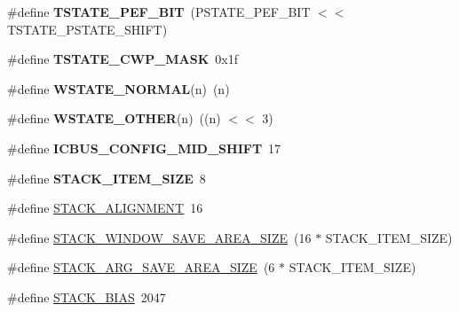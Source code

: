 \begin{DoxyCompactItemize}
\item 
\mbox{\label{group__RTEMSBSPsSPARC64_ga8a80b956f171cc4145cf4f3cc57d7ebe}} 
\#define {\bfseries T\+S\+T\+A\+T\+E\+\_\+\+P\+E\+F\+\_\+\+B\+IT}~(P\+S\+T\+A\+T\+E\+\_\+\+P\+E\+F\+\_\+\+B\+IT $<$$<$ T\+S\+T\+A\+T\+E\+\_\+\+P\+S\+T\+A\+T\+E\+\_\+\+S\+H\+I\+FT)
\item 
\mbox{\label{group__RTEMSBSPsSPARC64_gab14722100d17e34ddb3e3ad8031bc133}} 
\#define {\bfseries T\+S\+T\+A\+T\+E\+\_\+\+C\+W\+P\+\_\+\+M\+A\+SK}~0x1f
\item 
\mbox{\label{group__RTEMSBSPsSPARC64_ga2d86299a5ccd9eb0bda48db03a6f28c7}} 
\#define {\bfseries W\+S\+T\+A\+T\+E\+\_\+\+N\+O\+R\+M\+AL}(n)~(n)
\item 
\mbox{\label{group__RTEMSBSPsSPARC64_gaa19b0ad0aaa0bbd32865de9023f8de5d}} 
\#define {\bfseries W\+S\+T\+A\+T\+E\+\_\+\+O\+T\+H\+ER}(n)~((n) $<$$<$ 3)
\item 
\mbox{\label{group__RTEMSBSPsSPARC64_ga308aa0d1354ab88ac77fbc401af9b675}} 
\#define {\bfseries I\+C\+B\+U\+S\+\_\+\+C\+O\+N\+F\+I\+G\+\_\+\+M\+I\+D\+\_\+\+S\+H\+I\+FT}~17
\item 
\mbox{\label{group__RTEMSBSPsSPARC64_ga4c9fed829279adc1da933c1b5bbad58b}} 
\#define {\bfseries S\+T\+A\+C\+K\+\_\+\+I\+T\+E\+M\+\_\+\+S\+I\+ZE}~8
\item 
\#define \mbox{\hyperlink{group__RTEMSBSPsSPARC64_ga112ac222442ad424caa8087c47fa8430}{S\+T\+A\+C\+K\+\_\+\+A\+L\+I\+G\+N\+M\+E\+NT}}~16
\item 
\#define \mbox{\hyperlink{group__RTEMSBSPsSPARC64_gafd58a5d05425a8f8968b23f46cb78bc1}{S\+T\+A\+C\+K\+\_\+\+W\+I\+N\+D\+O\+W\+\_\+\+S\+A\+V\+E\+\_\+\+A\+R\+E\+A\+\_\+\+S\+I\+ZE}}~(16 $\ast$ S\+T\+A\+C\+K\+\_\+\+I\+T\+E\+M\+\_\+\+S\+I\+ZE)
\item 
\#define \mbox{\hyperlink{group__RTEMSBSPsSPARC64_gab476f3144642c382bf6c51a5b8fb19cc}{S\+T\+A\+C\+K\+\_\+\+A\+R\+G\+\_\+\+S\+A\+V\+E\+\_\+\+A\+R\+E\+A\+\_\+\+S\+I\+ZE}}~(6 $\ast$ S\+T\+A\+C\+K\+\_\+\+I\+T\+E\+M\+\_\+\+S\+I\+ZE)
\item 
\#define \mbox{\hyperlink{group__RTEMSBSPsSPARC64_ga2c2951039a73048a1c64c447591e4bb4}{S\+T\+A\+C\+K\+\_\+\+B\+I\+AS}}~2047

\end{DoxyCompactItemize}
